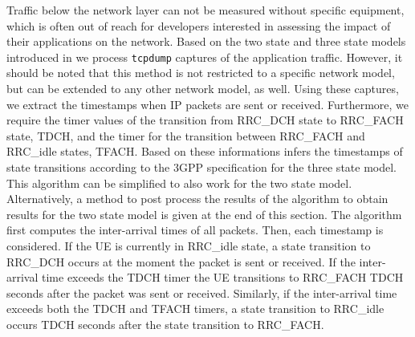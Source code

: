 Traffic below the network layer can not be measured without specific equipment, which is often out of reach for developers interested in assessing the impact of their applications on the network.
Based on the two state and three state models introduced in  we process \texttt{tcpdump} captures of the application traffic.
However, it should be noted that this method is not restricted to a specific network model, but can be extended to any other network model, as well.
Using these captures, we extract the timestamps when \gls{IP} packets are sent or received.
Furthermore, we require the timer values of the transition from \gls{RRC_DCH} state to \gls{RRC_FACH} state, \gls{TDCH}, and the timer for the transition between \gls{RRC_FACH} and \gls{RRC_idle} states, \gls{TFACH}.
Based on these informations  infers the timestamps of state transitions according to the \gls{3GPP} specification \cite{3GPP_RRC_Spec} for the three state model.
This algorithm can be simplified to also work for the two state model. 
Alternatively, a method to post process the results of the algorithm to obtain results for the two state model is given at the end of this section.
The algorithm first computes the inter-arrival times of all packets.
Then, each timestamp is considered.
If the \gls{UE} is currently in \gls{RRC_idle} state, a state transition to \gls{RRC_DCH} occurs at the moment the packet is sent or received.
If the inter-arrival time exceeds the \gls{TDCH} timer the \gls{UE} transitions to \gls{RRC_FACH} \gls{TDCH} seconds after the packet was sent or received.
Similarly, if the inter-arrival time exceeds both the \gls{TDCH} and \gls{TFACH} timers, a state transition to \gls{RRC_idle} occurs \gls{TDCH} seconds after the state transition to \gls{RRC_FACH}.


